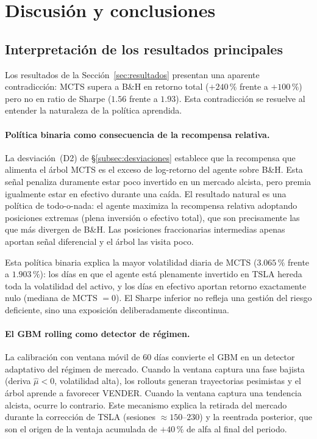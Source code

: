 \section{Discusión y conclusiones}
\label{sec:discusion}

\subsection{Interpretación de los resultados principales}
\label{subsec:interpretacion}

Los resultados de la Sección~\ref{sec:resultados} presentan una aparente contradicción: MCTS supera a B\&H en retorno total ($+240\,\%$ frente a $+100\,\%$) pero no en ratio de Sharpe ($1{.}56$ frente a $1{.}93$). Esta contradicción se resuelve al entender la naturaleza de la política aprendida.

\paragraph{Política binaria como consecuencia de la recompensa relativa.} La desviación~(D2) de §\ref{subsec:desviaciones} establece que la recompensa que alimenta el árbol MCTS es el exceso de log-retorno del agente sobre B\&H. Esta señal penaliza duramente estar poco invertido en un mercado alcista, pero premia igualmente estar en efectivo durante una caída. El resultado natural es una política de todo-o-nada: el agente maximiza la recompensa relativa adoptando posiciones extremas (plena inversión o efectivo total), que son precisamente las que más divergen de B\&H. Las posiciones fraccionarias intermedias apenas aportan señal diferencial y el árbol las visita poco.

Esta política binaria explica la mayor volatilidad diaria de MCTS ($3{.}065\,\%$ frente a $1{.}903\,\%$): los días en que el agente está plenamente invertido en TSLA hereda toda la volatilidad del activo, y los días en efectivo aportan retorno exactamente nulo (mediana de MCTS $= 0$). El Sharpe inferior no refleja una gestión del riesgo deficiente, sino una exposición deliberadamente discontinua.

\paragraph{El GBM rolling como detector de régimen.} La calibración con ventana móvil de $60$ días convierte el GBM en un detector adaptativo del régimen de mercado. Cuando la ventana captura una fase bajista (deriva $\hat\mu < 0$, volatilidad alta), los rollouts generan trayectorias pesimistas y el árbol aprende a favorecer VENDER. Cuando la ventana captura una tendencia alcista, ocurre lo contrario. Este mecanismo explica la retirada del mercado durante la corrección de TSLA (sesiones $\approx 150$--$230$) y la reentrada posterior, que son el origen de la ventaja acumulada de $+40\,\%$ de alfa al final del periodo.

